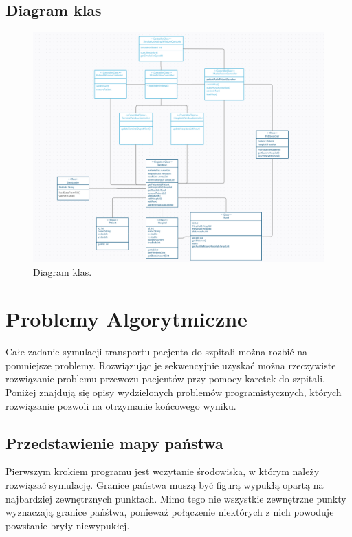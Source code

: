 \documentclass[10pt,a4paper]{article}
\begin{document}
\subsection{Diagram klas}

\begin{figure}[h]
  \includegraphics[width=\linewidth]{./images/diagram_klas.png}
  \caption{Diagram klas.}
  \label{fig:diagram_klas}
\end{figure}

\section{Problemy Algorytmiczne}

Całe zadanie symulacji transportu pacjenta do szpitali można rozbić na pomniejsze problemy.
Rozwiązując je sekwencyjnie uzyskać można rzeczywiste rozwiązanie problemu przewozu pacjentów przy pomocy karetek do szpitali.
Poniżej znajdują się opisy wydzielonych problemów programistycznych, których rozwiązanie pozwoli na otrzymanie końcowego wyniku.

\subsection{Przedstawienie mapy państwa}

Pierwszym krokiem programu jest wczytanie środowiska, w którym należy rozwiązać symulację.
Granice państwa muszą być figurą wypukłą opartą na najbardziej zewnętrznych punktach.
Mimo tego nie wszystkie zewnętrzne punkty wyznaczają granice pańśtwa, ponieważ połączenie niektórych z nich powoduje powstanie bryły niewypukłej.
\end{document}

